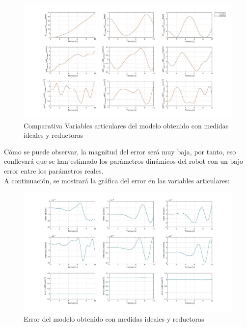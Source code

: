 \begin{figure}[h!]
	\centering
	\includegraphics[width=1\textwidth]{EstimacParam_SisMod_In1_IdealCR}
	\caption{Comparativa Variables articulares del modelo obtenido con medidas ideales y reductoras}
\end{figure}

Cómo se puede observar, la magnitud del error será muy baja, por tanto, eso conllevará que se han estimado los parámetros dinámicos del robot con un bajo error entre los parámetros reales.\\
\newpage
A continuación, se mostrará la gráfica del error en las variables articulares:

\begin{figure}[h!]
	\centering
	\includegraphics[width=1\textwidth]{EstimacParam_SisModError_In1_IdealCR}
	\caption{Error del modelo obtenido con medidas ideales y reductoras}
\end{figure}

